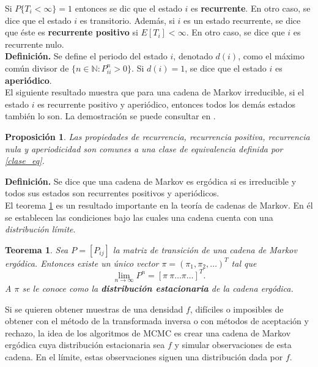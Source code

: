 \documentclass[11pt,a4paper]{article}
\newtheorem{theorem}{Teorema}[section]
\newtheorem{proposition}{Proposición}[subsection]
\begin{document}
Si $P\lbrace T_i < \infty \rbrace = 1 $ entonces se dic que el estado $i$ es \textbf{recurrente}. En otro caso, se dice que el estado $i$ es transitorio. Además, si $i$ es un estado recurrente, se dice que éste es \textbf{recurrente positivo} si $E\left[T_i\right] < \infty$. En otro caso, se dice que $i$ es recurrente nulo.\\

\textbf{Definición.} Se define el periodo del estado $i$, denotado $d(i)$, como el máximo común divisor de $\lbrace n\in \mathbb{N}: P_{ii}^n > 0\rbrace.$ Si $d(i)=1$, se dice que el estado $i$ es \textbf{aperiódico}.\\

El siguiente resultado muestra que para una cadena de Markov irreducible, si el estado $i$ es recurrente positivo y aperiódico, entonces todos los demás estados también lo son. La demostración se puede consultar en \citet{ross}.

\begin{proposition}
Las propiedades de recurrencia, recurrencia positiva, recurrencia nula y aperiodicidad son comunes a una clase de equivalencia definida por \eqref{clase_eq}.
\end{proposition}

\textbf{Definición.} Se dice que una cadena de Markov es ergódica si es irreducible y todos sus estados son recurrentes positivos y aperiódicos.\\

El teorema \ref{teo:ergodic} es un resultado importante en la teoría de cadenas de Markov. En él se establecen las condiciones bajo las cuales una cadena cuenta con una \textit{distribución límite}.

\begin{theorem}
\label{teo:ergodic}
Sea $P=[P_{ij}]$ la matriz de transición de una cadena de Markov ergódica. Entonces existe un único vector $\pi = (\pi_1, \pi_2, \dots)^T$ tal que
\begin{equation} \label{dist_limite}
\lim_{n \to \infty}P^n = [\pi \ \pi \dots \pi \dots ]^T.
\end{equation}
A $\pi$ se le conoce como la \textbf{distribución estacionaria} de la cadena ergódica.
\end{theorem}

Si se quieren obtener muestras de una densidad $f$, difíciles o imposibles de obtener con el método de la transformada inversa o con métodos de aceptación y rechazo, la idea de los algoritmos de MCMC es crear una cadena de Markov ergódica cuya distribución estacionaria sea $f$ y simular observaciones de esta cadena. En el límite, estas observaciones siguen una distribución dada por $f$.\\
\end{document}
